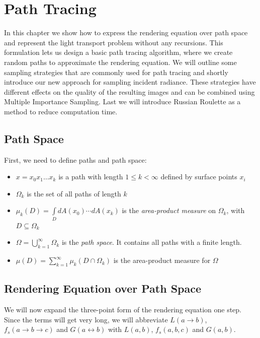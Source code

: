 \chapter{Path Tracing}
\label{chaper:PathTracing}
In this chapter we show how to express the rendering equation over path space and represent the light transport problem without any recursions. This formulation lets us design a basic path tracing algorithm, where we create random paths to approximate the rendering equation. We will outline some sampling strategies that are commonly used for path tracing and shortly introduce our new approach for sampling incident radiance. These strategies have different effects on the quality of the resulting images and can be combined using Multiple Importance Sampling. Last we will introduce Russian Roulette as a method to reduce computation time.

\section{Path Space}

First, we need to define paths and path space:
\begin{itemize}
\item $x=x_0x_1\dots x_k$ is a path with length $1 \leq k < \infty$ defined by surface points $x_i$ \\
\item $\Omega_k$ is the set of all paths of length $k$\\
\item $\mu_k(D) = \int\limits_DdA(x_0) \cdots dA(x_k)$ is the \emph{area-product measure} on $\Omega_k$, with $D\subseteq \Omega_k$
\item $\Omega = \bigcup\limits_{k=1}^\infty \Omega_k$ is the \emph{path space}. It contains all paths with a finite length.
\item $\mu(D) = \sum\limits_{k=1}^\infty \mu_k(D\cap \Omega_k)$ is the area-product measure for $\Omega$
\end{itemize}

\section{Rendering Equation over Path Space}

We will now expand the three-point form of the rendering equation one step. Since the terms will get very long, we will abbreviate $L(a \rightarrow b)$, $f_s(a \rightarrow b \rightarrow c)$ and $G(a \leftrightarrow b)$ with $L(a,b)$, $f_s(a,b,c)$ and $G(a,b)$.

